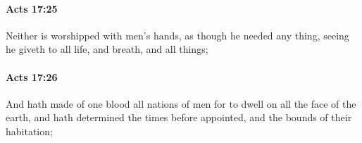 		\paragraph{Acts 17:25} %
			\label{ACTS-17-25}

			Neither is worshipped with men's hands, as though he needed any thing, seeing he giveth to all life, and breath, and all things;

			\begin{framed}
			\scriptsize
				\begin{compactdesc}
					\item[SBLG] 
				\end{compactdesc}
			\end{framed}

		\paragraph{Acts 17:26} %
			\label{ACTS-17-26}

			And hath made of one blood all nations of men for to dwell on all the face of the earth, and hath determined the times before appointed, and the bounds of their habitation;

